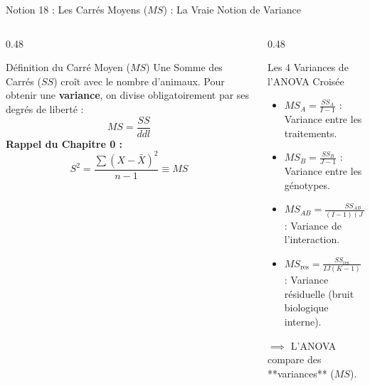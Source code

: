 \documentclass[aspectratio=169,10pt]{beamer}
\begin{document}
\begin{frame}{Notion 18 : Les Carrés Moyens ($MS$) : La Vraie Notion de Variance}
  \begin{columns}[onlytextwidth, T]
    \begin{column}{0.48\linewidth}
      \begin{conceptbox}{Définition du Carré Moyen ($MS$)}
        Une Somme des Carrés ($SS$) croît avec le nombre d'animaux. Pour obtenir une \textbf{variance}, on divise obligatoirement par ses degrés de liberté :
        \begin{equation*}
          MS = \frac{SS}{ddl}
        \end{equation*}
        \textbf{Rappel du Chapitre 0 :}
        \begin{equation*}
          S^2 = \frac{\sum (X - \bar{X})^2}{n - 1} \equiv MS
        \end{equation*}
      \end{conceptbox}
    \end{column}
    \begin{column}{0.48\linewidth}
      \begin{biobox}{Les 4 Variances de l'ANOVA Croisée}
        \begin{itemize}
          \item $MS_A = \frac{SS_A}{I-1}$ : Variance entre les traitements.
          \item $MS_B = \frac{SS_B}{J-1}$ : Variance entre les génotypes.
          \item $MS_{AB} = \frac{SS_{AB}}{(I-1)(J-1)}$ : Variance de l'interaction.
          \item $MS_{\text{res}} = \frac{SS_{\text{res}}}{IJ(K-1)}$ : Variance résiduelle (bruit biologique interne).
        \end{itemize}
        $\implies$ L'ANOVA compare des **variances** ($MS$).
      \end{biobox}
    \end{column}
  \end{columns}
\end{frame}
\end{document}
